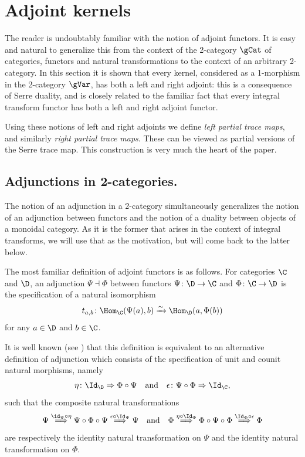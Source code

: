 \section{Adjoint kernels}
\label{sec:adjoints}

The reader is undoubtably familiar with the notion of adjoint
functors.  It is easy and natural to generalize this from the context
of the 2-category $\gCat$ of categories, functors and natural
transformations to the context of an arbitrary 2-category.  In this
section it is shown that every kernel, considered as a 1-morphism in
the 2-category $\gVar$, has both a left and right adjoint: this is a
consequence of Serre duality, and is closely related to the familiar
fact that every integral transform functor has both a left and right
adjoint functor.

Using these notions of left and right adjoints we define \emph{left
  partial trace maps}, and similarly \emph{right partial trace
  maps}. These can be viewed as partial versions of the Serre trace
map. This construction is very much the heart of the paper.

 \subsection{Adjunctions in 2-categories.}
The notion of an adjunction in a 2-category simultaneously generalizes
the notion of an adjunction between functors and the notion of a
duality between objects of a monoidal category.  As it is the former
that arises in the context of integral transforms, we will use that as
the motivation, but will come back to the latter below.


The most familiar definition of adjoint functors is as follows.  For
categories $\C$ and $\D$, an adjunction $\Psi\dashv \Phi$ between
functors $\Psi\colon \D\to \C$ and $\Phi\colon \C\to \D$ is the
specification of a natural isomorphism
\[t_{a,b}\colon \Hom_\C(\Psi(a),b)\xrightarrow{\sim}
\Hom_\D(a,\Phi(b))\]
for any $a\in \D$ and $b\in\C$.


It is well known (see \cite[page 91]{GelfandManin}) that this definition is
equivalent to an alternative definition of adjunction which consists
of the specification of unit and counit natural morphisms, namely
\[\eta\colon \Id_\D \Rightarrow \Phi\circ \Psi
\quad\text{and}\quad \epsilon\colon \Psi\circ \Phi\Rightarrow
\Id_\C, \]
such that the composite natural transformations
\[ \Psi \stackrel{\id_\Psi\circ\eta}\Longrightarrow
\Psi\circ\Phi\circ\Psi \stackrel{\epsilon\circ\Id_\Psi}\Longrightarrow
\Psi \quad\text{and}\quad \Phi
\stackrel{\eta\circ\Id_\Phi}\Longrightarrow \Phi\circ\Psi\circ\Phi
\stackrel{\Id_\Phi\circ\epsilon}\Longrightarrow \Phi
\]
are respectively the identity natural transformation on $\Psi$ and
the identity natural transformation on $\Phi$.


